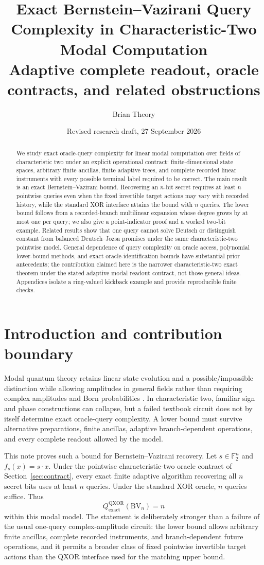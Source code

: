 \documentclass[11pt]{article}
\title{Exact Bernstein--Vazirani Query Complexity in Characteristic-Two Modal Computation\\\large Adaptive complete readout, oracle contracts, and related obstructions}
\author{Brian Theory}
\date{Revised research draft, 27 September 2026}
\newcommand{\F}{\mathbb F}
\begin{document}
\maketitle

\begin{abstract}
We study exact oracle-query complexity for linear modal computation over fields of characteristic two under an explicit operational contract: finite-dimensional state spaces, arbitrary finite ancillas, finite adaptive trees, and complete recorded linear instruments with every possible terminal label required to be correct. The main result is an exact Bernstein--Vazirani bound. Recovering an $n$-bit secret requires at least $n$ pointwise queries even when the fixed invertible target actions may vary with recorded history, while the standard XOR interface attains the bound with $n$ queries. The lower bound follows from a recorded-branch multilinear expansion whose degree grows by at most one per query; we also give a point-indicator proof and a worked two-bit example. Related results show that one query cannot solve Deutsch or distinguish constant from balanced Deutsch--Jozsa promises under the same characteristic-two pointwise model. General dependence of query complexity on oracle access, polynomial lower-bound methods, and exact oracle-identification bounds have substantial prior antecedents; the contribution claimed here is the narrower characteristic-two exact theorem under the stated adaptive modal readout contract, not those general ideas. Appendices isolate a ring-valued kickback example and provide reproducible finite checks.
\end{abstract}

\section{Introduction and contribution boundary}
Modal quantum theory retains linear state evolution and a possible/impossible distinction while allowing amplitudes in general fields rather than requiring complex amplitudes and Born probabilities \cite{Schumacher2010,Schumacher2012}. In characteristic two, familiar sign and phase constructions can collapse, but a failed textbook circuit does not by itself determine exact oracle-query complexity. A lower bound must survive alternative preparations, finite ancillas, adaptive branch-dependent operations, and every complete readout allowed by the model.

This note proves such a bound for Bernstein--Vazirani recovery. Let $s\in\F_2^n$ and $f_s(x)=s\cdot x$. Under the pointwise characteristic-two oracle contract of Section~\ref{sec:contract}, every exact finite adaptive algorithm recovering all $n$ secret bits uses at least $n$ queries. Under the standard XOR oracle, $n$ queries suffice. Thus
\[
 Q_{\mathrm{exact}}^{\mathrm{QXOR}}(\mathrm{BV}_n)=n
\]
within this modal model. The statement is deliberately stronger than a failure of the usual one-query complex-amplitude circuit: the lower bound allows arbitrary finite ancillas, complete recorded instruments, and branch-dependent future operations, and it permits a broader class of fixed pointwise invertible target actions than the QXOR interface used for the matching upper bound.
\end{document}
